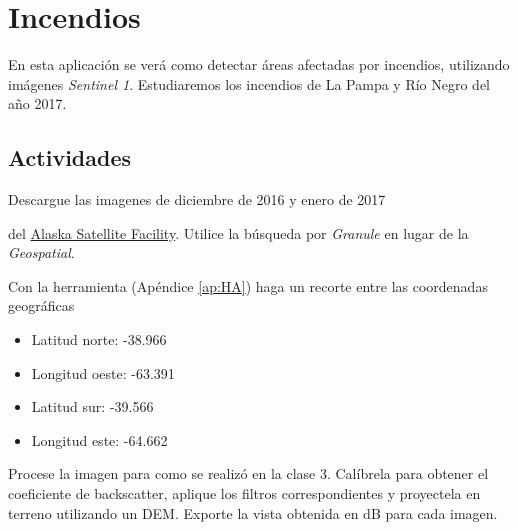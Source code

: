 \section{Incendios}
En esta aplicación se verá como detectar áreas afectadas por incendios, utilizando imágenes \emph{Sentinel 1}. Estudiaremos los incendios de La Pampa y Río Negro del año 2017.


\subsection{Actividades}

\begin{que}
    Descargue las imagenes de diciembre de 2016 y enero de 2017
    \begin{center}\end{center}
    \begin{center}\end{center}

      del \href{https://vertex.daac.asf.alaska.edu/}{Alaska Satellite Facility}. Utilice la búsqueda por \emph{Granule} en lugar de la \emph{Geospatial}.
\end{que}

\begin{que}
    Con la herramienta  (Apéndice \ref{ap:HA}) haga un recorte entre las coordenadas geográficas
    \begin{itemize}
        \item Latitud norte: -38.966
        \item Longitud oeste: -63.391
        \item Latitud sur: -39.566
        \item Longitud este: -64.662
    \end{itemize}
\end{que}

\begin{que}
    Procese la imagen para como se realizó en la clase 3. Calíbrela para obtener el coeficiente de backscatter, aplique los filtros correspondientes y proyectela en terreno utilizando un DEM. Exporte la vista obtenida en dB para cada imagen.
\end{que}

